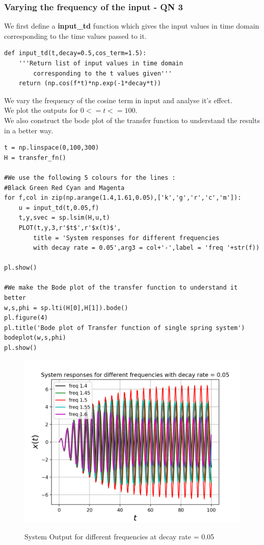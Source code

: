 \documentclass[11pt, a4paper]{article}
\begin{document}
\subsubsection{Varying the frequency of the input - QN 3}
We first define a \textbf{input\_td} function which gives the input values in time domain corresponding to the time values passed to it.
\begin{verbatim}
def input_td(t,decay=0.5,cos_term=1.5):
	'''Return list of input values in time domain 
		corresponding to the t values given'''
	return (np.cos(f*t)*np.exp(-1*decay*t))
\end{verbatim}
{
We vary the frequency of the cosine term in input and analyse it's effect.
\\We plot the outputs for $0 <= t <= 100$.
\\We also construct the bode plot of the transfer function to understand the results in a better way.
}
\begin{verbatim}
t = np.linspace(0,100,300)
H = transfer_fn()

#We use the following 5 colours for the lines :
#Black Green Red Cyan and Magenta
for f,col in zip(np.arange(1.4,1.61,0.05),['k','g','r','c','m']):
	u = input_td(t,0.05,f)
	t,y,svec = sp.lsim(H,u,t)
	PLOT(t,y,3,r'$t$',r'$x(t)$',
		title = 'System responses for different frequencies 
		with decay rate = 0.05',arg3 = col+'-',label = 'freq '+str(f))

pl.show()

#We make the Bode plot of the transfer function to understand it better
w,s,phi = sp.lti(H[0],H[1]).bode()
pl.figure(4)
pl.title('Bode plot of Transfer function of single spring system')
bodeplot(w,s,phi) 
pl.show()

\end{verbatim}
\begin{figure}[H]
   	\centering
   	\includegraphics[scale=0.6]{ss_freq.png}
   	\label{fig:ss_freq}
   	\caption{System Output for different frequencies at decay rate = 0.05}
\end{figure}
\end{document}

